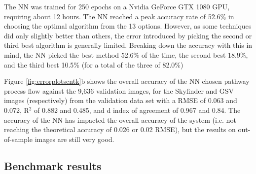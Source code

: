 \documentclass[final,3p,times,authoryear]{elsarticle}
\begin{document}
The NN was trained for 250 epochs on a Nvidia GeForce GTX 1080 GPU, requiring about 12 hours. The NN reached a peak accuracy rate of 52.6\% in choosing the optimal algorithm from the 13 options. However, as some techniques did only slightly better than others, the error introduced by picking the second or third best algorithm is generally limited. Breaking down the accuracy with this in mind, the NN picked the best method 52.6\% of the time, the second best 18.9\%, and the third best 10.5\% (for a total of the three of 82.0\%)

Figure \ref{fig:errorplotscntk}b shows the overall accuracy of the NN chosen pathway process flow against the 9,636 validation images, for the Skyfinder and GSV images (respectively) from the validation data set with a RMSE of 0.063 and 0.072, R$^{2}$ of 0.882 and 0.485, and d index of agreement of 0.967 and 0.84. The accuracy of the NN has impacted the overall accuracy of the system (i.e. not reaching the theoretical accuracy of 0.026 or 0.02 RMSE), but the results on out-of-sample images are still very good. 













\subsection{Benchmark results}
\end{document}
